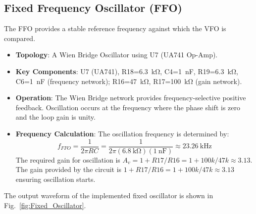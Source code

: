 \documentclass[conference]{IEEEtran}
\begin{document}
\subsection{Fixed Frequency Oscillator (FFO)}
The FFO provides a stable reference frequency against which the VFO is compared.
\begin{itemize}
    \item \textbf{Topology}: A Wien Bridge Oscillator using U7 (UA741 Op-Amp).
    \item \textbf{Key Components}: U7 (UA741), R18=\SI{6.3}{\kilo\ohm}, C4=\SI{1}{\nano\farad}, R19=\SI{6.3}{\kilo\ohm}, C6=\SI{1}{\nano\farad} (frequency network); R16=\SI{47}{\kilo\ohm}, R17=\SI{100}{\kilo\ohm} (gain network).
    \item \textbf{Operation}: The Wien Bridge network provides frequency-selective positive feedback. Oscillation occurs at the frequency where the phase shift is zero and the loop gain is unity.
    \item \textbf{Frequency Calculation}: The oscillation frequency is determined by:
        \begin{equation}
            f_{FFO} = \frac{1}{2\pi RC} = \frac{1}{2\pi (\SI{6.8}{\kilo\ohm})(\SI{1}{\nano\farad})} \approx \SI{23.26}{\kilo\hertz}
        \end{equation}
        The required gain for oscillation is $A_v = 1 + R17/R16 = 1 + 100k/47k \approx 3.13$. The gain provided by the circuit is $1 + R17/R16 = 1+100k/47k \approx 3.13$ ensuring oscillation starts.
\end{itemize}
The output waveform of the implemented fixed oscillator is shown in Fig.~\ref{fig:Fixed_Oscillator}.
\end{document}
